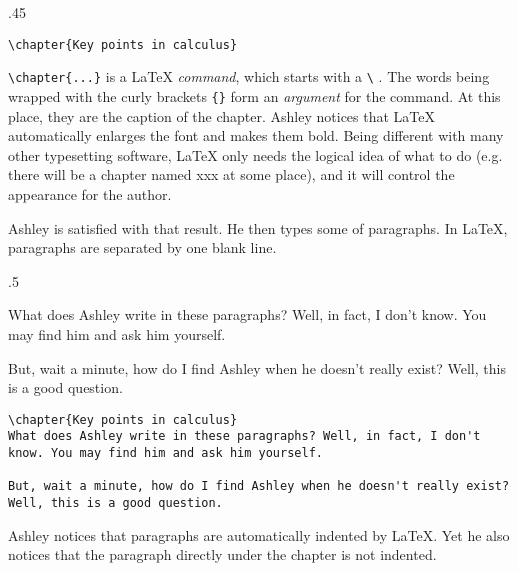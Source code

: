 \begin{miniexammar}{.45\textandmarginlen}{}
\begin{lstlisting}
\chapter{Key points in calculus}
\end{lstlisting}
\end{miniexammar}
\verb=\chapter{...}= is a \LaTeX{} \emph{command}, which starts with a \verb=\=%
. The words being wrapped with the curly brackets \verb={}= form an \emph{argument} for the command. At this place, they are the caption of the chapter. Ashley notices that \LaTeX{} automatically enlarges the font and makes them bold. Being different with many other typesetting software, \LaTeX{} only needs the logical idea of what to do (e.g. there will be a chapter named xxx at some place), and it will control the appearance for the author.

Ashley is satisfied with that result. He then types some of paragraphs. In \LaTeX{}, paragraphs are separated by one blank line.

\begin{miniexammar}{.5\textandmarginlen}{
%
What does Ashley write in these paragraphs? Well, in fact, I don't know. You may find him and ask him yourself.
		
\hspace{1.5em}But, wait a minute, how do I find Ashley when he doesn't really exist? Well, this is a good question.}
\begin{lstlisting}
\chapter{Key points in calculus}
What does Ashley write in these paragraphs? Well, in fact, I don't know. You may find him and ask him yourself.
		
But, wait a minute, how do I find Ashley when he doesn't really exist? Well, this is a good question.
\end{lstlisting}
\end{miniexammar}
Ashley notices that paragraphs are automatically indented by \LaTeX{}. Yet he also notices that the paragraph directly under the chapter is not indented.

